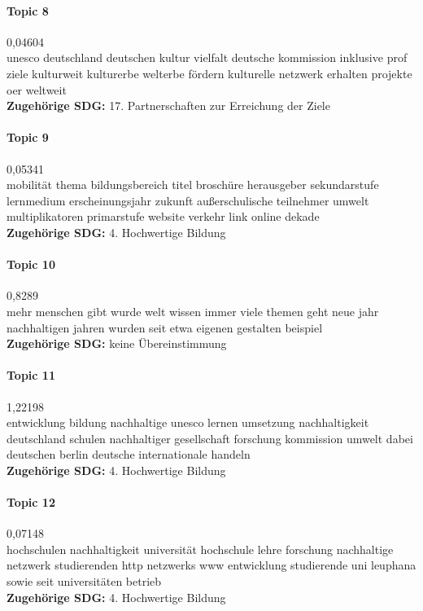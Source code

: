 \documentclass[a4paper,11pt]{article}
\begin{document}
\paragraph{Topic 8} 0,04604 \\
unesco deutschland deutschen kultur vielfalt deutsche kommission inklusive
prof ziele kulturweit kulturerbe welterbe fördern kulturelle netzwerk erhalten
projekte oer weltweit   \\ 
\textbf{Zugehörige SDG:} 17. Partnerschaften zur Erreichung der Ziele 

\paragraph{Topic 9} 0,05341  \\
mobilität thema bildungsbereich titel broschüre herausgeber sekundarstufe
lernmedium erscheinungsjahr zukunft außerschulische teilnehmer umwelt
multiplikatoren primarstufe website verkehr link online dekade    \\ 
\textbf{Zugehörige SDG:} 4. Hochwertige Bildung 

\paragraph{Topic 10} 0,8289 \\
mehr menschen gibt wurde welt wissen immer viele themen geht neue jahr
nachhaltigen jahren wurden seit etwa eigenen gestalten beispiel    \\
\textbf{Zugehörige SDG:} keine Übereinstimmung 

\paragraph{Topic 11} 1,22198 \\
entwicklung bildung nachhaltige unesco lernen umsetzung nachhaltigkeit
deutschland schulen nachhaltiger gesellschaft forschung kommission umwelt
dabei deutschen berlin deutsche internationale handeln \\
\textbf{Zugehörige SDG:} 4. Hochwertige Bildung 
   
\paragraph{Topic 12} 0,07148 \\
hochschulen nachhaltigkeit universität hochschule lehre forschung nachhaltige
netzwerk studierenden http netzwerks www entwicklung studierende uni leuphana
sowie seit universitäten betrieb \\
\textbf{Zugehörige SDG:} 4. Hochwertige Bildung 
   
\end{document}
